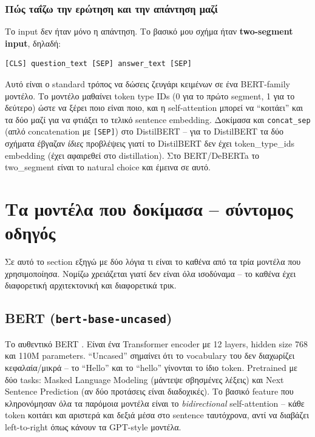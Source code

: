 \documentclass[12pt]{fphw}
\begin{document}
\subsubsection{Πώς ταΐζω την ερώτηση και την απάντηση μαζί}

Το input δεν ήταν μόνο η απάντηση. Το βασικό μου σχήμα ήταν \textbf{two-segment input}, δηλαδή:
\begin{verbatim}
[CLS] question_text [SEP] answer_text [SEP]
\end{verbatim}
Αυτό είναι ο standard τρόπος να δώσεις ζευγάρι κειμένων σε ένα BERT-family μοντέλο. Το μοντέλο μαθαίνει token type IDs (0 για το πρώτο segment, 1 για το δεύτερο) ώστε να ξέρει ποιο είναι ποιο, και η self-attention μπορεί να ``κοιτάει'' και τα δύο μαζί για να φτιάξει το τελικό sentence embedding. Δοκίμασα και \texttt{concat\_sep} (απλό concatenation με \texttt{[SEP]}) στο DistilBERT -- για το DistilBERT τα δύο σχήματα έβγαζαν \emph{ίδιες} προβλέψεις γιατί το DistilBERT δεν έχει token\_type\_ids embedding (έχει αφαιρεθεί στο distillation). Στο BERT/DeBERTa το two\_segment είναι το natural choice και έμεινα σε αυτό.

\section{Τα μοντέλα που δοκίμασα -- σύντομος οδηγός}

Σε αυτό το section εξηγώ με δύο λόγια τι είναι το καθένα από τα τρία μοντέλα που χρησιμοποίησα. Νομίζω χρειάζεται γιατί δεν είναι όλα ισοδύναμα -- το καθένα έχει διαφορετική αρχιτεκτονική και διαφορετικά τρικ.

\subsection{BERT (\texttt{bert-base-uncased})}

Το αυθεντικό BERT \cite{devlin2019bert}. Είναι ένα Transformer encoder με 12 layers, hidden size 768 και 110M parameters. ``Uncased'' σημαίνει ότι το vocabulary του δεν διαχωρίζει κεφαλαία/μικρά -- το ``Hello'' και το ``hello'' γίνονται το ίδιο token. Pretrained με δύο tasks: Masked Language Modeling (μάντεψε σβησμένες λέξεις) και Next Sentence Prediction (αν δύο προτάσεις είναι διαδοχικές). Το βασικό feature που κληρονόμησαν όλα τα παρόμοια μοντέλα είναι το \emph{bidirectional} self-attention -- κάθε token κοιτάει και αριστερά και δεξιά μέσα στο sentence ταυτόχρονα, αντί να διαβάζει left-to-right όπως κάνουν τα GPT-style μοντέλα.
\end{document}
